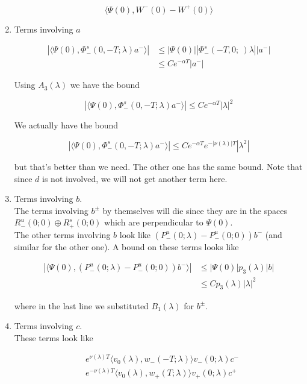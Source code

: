 \documentclass[12pt]{article}
\begin{document}
\begin{enumerate}
\[
\langle \Psi(0), W^-(0) - W^+(0) \rangle 
\]

\item Terms involving $a$

\begin{align*}
|\langle \Psi(0), \Phi^s_-(0, -T; \lambda )a^- \rangle| &\leq |\Psi(0)||\Phi^s_-(-T, 0; \
)\lambda||a^-| \\
&\leq C e^{-\alpha T} |a^-|
\end{align*}

Using $A_3(\lambda)$ we have the bound

\[
|\langle \Psi(0), \Phi^s_-(0, -T; \lambda )a^- \rangle| \leq C e^{-\alpha T} |\lambda|^2
\]

We actually have the bound 

\[
|\langle \Psi(0), \Phi^s_-(0, -T; \lambda )a^- \rangle| \leq C e^{-\alpha T} e^{-|\nu(\lambda)|T} |\lambda^2|
\]

but that's better than we need. The other one has the same bound. Note that since $d$ is not involved, we will not get another term here.

\item Terms involving $b$.\\

The terms involving $b^\pm$ by themselves will die since they are in the spaces $R^u_-(0; 0) \oplus R^s_+(0; 0)$ which are perpendicular to $\Psi(0)$.\\

The other terms involving $b$ look like $(P^u_-(0; \lambda) - P^u_-(0; 0))b^-$ (and similar for the other one). A bound on these terms looks like

\begin{align*}
|\langle \Psi(0), (P^u_-(0; \lambda) - P^u_-(0; 0))b^- \rangle|
&\leq |\Psi(0)| p_3(\lambda)|b| \\
&\leq C p_3(\lambda) |\lambda|^2
\end{align*}

where in the last line we substituted $B_1(\lambda)$ for $b^\pm$.

\item Terms involving $c$.\\

These terms look like

\begin{align*}
&e^{\nu(\lambda)T} \langle v_0(\lambda), w_-(-T; \lambda) \rangle v_-(0; \lambda) c^- \\
&e^{-\nu(\lambda)T} \langle v_0(\lambda), w_+(T; \lambda) \rangle v_+(0; \lambda) c^+
\end{align*}


\end{enumerate}
\end{document}
